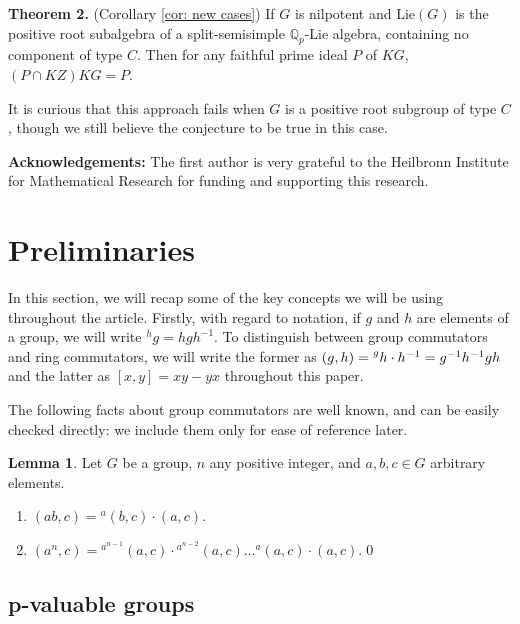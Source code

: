 \documentclass[12pt,a4paper]{article}
\def\({}%
\def\){}%
\theoremstyle{definition}
\newtheorem{lem}[thm]{Lemma}
\theoremstyle{remark}
\theoremstyle{custthm}
\begin{document}
\textbf{Theorem 2.} (Corollary \ref{cor: new cases}) If $G$ is nilpotent and Lie$(G)$ is the positive root subalgebra of a split-semisimple $\mathbb{Q}_p$-Lie algebra, containing no component of type $C$. Then for any faithful prime ideal $P$ of $KG$, $(P\cap KZ)KG=P$.

It is curious that this approach fails when $G$ is a positive root subgroup of type $C$, though we still believe the conjecture to be true in this case.

\textbf{Acknowledgements:} The first author is very grateful to the Heilbronn Institute for Mathematical Research for funding and supporting this research.

\section{Preliminaries}

In this section, we will recap some of the key concepts we will be using throughout the article. Firstly, with regard to notation, if $g$ and $h$ are elements of a group, we will write ${}^h g = hgh^{-1}$. To distinguish between group commutators and ring commutators, we will write the former as $(g,h) = {\vphantom{h}}^g h \cdot h^{-1} = g^{-1}h^{-1}gh$ and the latter as $[x,y] = xy - yx$ throughout this paper.

The following facts about group commutators are well known, and can be easily checked directly: we include them only for ease of reference later.

\begin{lem}\label{lem: commutators}
Let $G$ be a group, $n$ any positive integer, and $a,b,c\in G$ arbitrary elements.

\begin{enumerate}[label=(\roman*)]
\item $(ab, c) = {}^a (b,c) \cdot (a,c)$.
\item $(a^n, c) = {}^{a^{n-1}}(a,c) \cdot {}^{a^{n-2}}(a,c) \dots {}^{a}(a,c) \cdot (a,c)$.\qed
\end{enumerate}
\end{lem}

\subsection{\(p\)-valuable groups}
\end{document}
